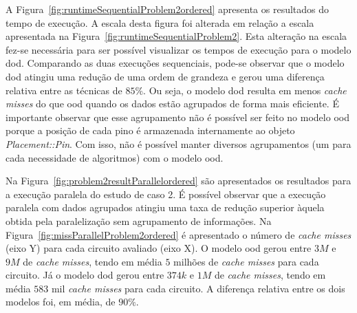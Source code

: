 

A Figura~\ref{fig:runtimeSequentialProblem2ordered} apresenta os resultados do tempo de execução. A escala desta figura foi alterada em relação a escala apresentada na Figura~\ref{fig:runtimeSequentialProblem2}. Esta alteração na escala fez-se necessária para ser possível visualizar os tempos de execução para o modelo \ac{dod}.
Comparando as duas execuções sequenciais, pode-se observar que o modelo \ac{dod} atingiu uma redução de uma ordem de grandeza e gerou uma diferença relativa entre as técnicas de $85\%$. 
Ou seja, o modelo \ac{dod} resulta em menos \textit{cache misses} do que \ac{ood} quando os dados estão agrupados de forma mais eficiente.
É importante observar que esse agrupamento não é possível ser feito no modelo \ac{ood} porque a posição de cada pino é armazenada internamente ao objeto \textit{Placement::Pin}.
Com isso, não é possível manter diversos agrupamentos (um para cada necessidade de algoritmos) com o modelo \ac{ood}.


Na Figura~\ref{fig:problem2resultParallelordered} são apresentados os resultados para a execução paralela do estudo de caso 2.
É possível observar que a execução paralela com dados agrupados atingiu uma taxa de redução superior àquela obtida pela paralelização sem agrupamento de informações.
Na Figura~\ref{fig:missParallelProblem2ordered} é apresentado o número de  \textit{cache misses} (eixo Y) para cada circuito avaliado (eixo X).
O modelo \ac{ood} gerou entre $3M$ e $9M$ de \textit{cache misses}, tendo em média $5$ milhões de  \textit{cache misses} para cada circuito.
Já o modelo \ac{dod} gerou entre $374k$ e $1M$ de \textit{cache misses}, tendo em média $583$ mil  \textit{cache misses} para cada circuito. 
A diferença relativa entre os dois modelos foi, em média, de $90\%$.

